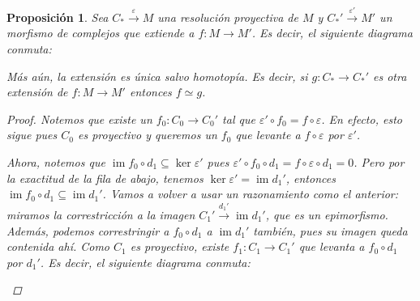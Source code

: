 \documentclass[12pt]{book}
\newtheorem{prop}[teo]{Proposición}
\theoremstyle{definition}
\DeclareMathOperator{\im}{im}
\begin{document}
\begin{prop}
Sea $C_*\stackrel{\varepsilon}{\longrightarrow}M$ una resolución proyectiva de $M$ y $C_*'\stackrel{\varepsilon'}{\longrightarrow} M'$ un morfismo de complejos que extiende a $f:M\to M'$. Es decir, el siguiente diagrama conmuta:

\begin{center}\end{center}

Más aún, la extensión es única salvo homotopía. Es decir, si $g:C_*\to C_*'$ es otra extensión de $f:M\to M'$ entonces $f\simeq g$.

\begin{proof}

Notemos que existe un $f_0:C_0\to C_0'$ tal que $\varepsilon'\circ f_0 = f\circ\varepsilon$. En efecto, esto sigue pues $C_0$ es proyectivo y queremos un $f_0$ que levante a $f\circ\varepsilon$ por $\varepsilon'$.

Ahora, notemos que $\im f_0\circ d_1 \subseteq \ker \varepsilon'$ pues $\varepsilon'\circ f_0\circ d_1 = f\circ\varepsilon\circ d_1 = 0$. Pero por la exactitud de la fila de abajo, tenemos $\ker \varepsilon' = \im d_1'$, entonces $\im f_0\circ d_1 \subseteq \im d_1'$. Vamos a volver a usar un razonamiento como el anterior: miramos la correstricción a la imagen $C_1'\stackrel{d_1'}{\longrightarrow}\im d_1'$, que es un epimorfismo. Además, podemos correstringir a $f_0\circ d_1$ a $\im d_1'$ también, pues su imagen queda contenida ahí. Como $C_1$ es proyectivo, existe $f_1:C_1\to C_1'$ que levanta a $f_0\circ d_1$ por $d_1'$. Es decir, el siguiente diagrama conmuta:

\begin{center}
\end{center}


\end{proof}
\end{prop}
\end{document}
